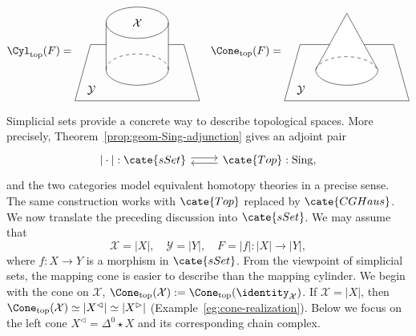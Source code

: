 \[ \Cyl_{\mathrm{top}}(F) = \begin{tikzpicture}[baseline=(O)]
	\draw (1, 1.5) ellipse[x radius=1, y radius=0.5] node {$\mathcal{X}$};
	\draw (0, 0) arc[start angle=180, end angle=360, x radius=1, y radius=0.5];
	\draw[dashed] (0, 0) arc[start angle=180, end angle=0, x radius=1, y radius=0.5];
	\draw (2, 1.5) -- (2, 0);
	\draw (0, 1.5) -- (0, 0);
	\draw (0, 0.8) -- (-0.5, 0.8) -- (-1, -1) node[xshift=1.5em,  yshift=1em] {$\mathcal{Y}$} -- (3, -1) -- (2.5, 0.8) -- (2, 0.8);
	\coordinate (O) at (0, 0.5);
\end{tikzpicture} \quad
	\Cone_{\mathrm{top}}(F) = \begin{tikzpicture}[baseline=(O)]
	\draw (0, 0.8) -- (-0.5, 0.8) -- (-1, -1) node[xshift=1.5em,  yshift=1em] {$\mathcal{Y}$} -- (3, -1) -- (2.5, 0.8) --cycle;
	\filldraw[fill=white] (1, 1.8) -- (0, 0) arc[start angle=180, end angle=360, x radius=1, y radius=0.5] --cycle;
	\draw[dashed] (0, 0) arc[start angle=170, end angle=10, x radius=1, y radius=0.5];
	\coordinate (O) at (0, 0.5);
\end{tikzpicture}\]

Simplicial sets provide a concrete way to describe topological spaces. More
precisely, Theorem~\ref{prop:geom-Sing-adjunction} gives an adjoint pair
\[\begin{tikzcd}
	{|\cdot|}: \cate{sSet} \arrow[shift left, r] & \cate{Top}: \mathrm{Sing}, \arrow[shift left, l]
\end{tikzcd}\]
and the two categories model equivalent homotopy theories in a precise
sense. The same construction works with $\cate{Top}$ replaced by
$\cate{CGHaus}$. We now translate the preceding discussion into
$\cate{sSet}$. We may assume that
\[ \mathcal{X} = |X|, \quad \mathcal{Y} = |Y|, \quad F = |f|: |X| \to |Y|, \]
where $f:X\to Y$ is a morphism in $\cate{sSet}$. From the viewpoint of
simplicial sets, the mapping cone is easier to describe than the mapping
cylinder. We begin with the cone on $\mathcal{X}$,
$\Cone_{\mathrm{top}}(\mathcal{X}):=
\Cone_{\mathrm{top}}(\identity_{\mathcal{X}})$. If
$\mathcal{X}=|X|$, then
$\Cone_{\mathrm{top}}(\mathcal{X})\simeq|X^{\lhd}|\simeq|X^{\rhd}|$
(Example~\ref{eg:cone-realization}). Below we focus on the left cone
$X^{\lhd}=\Delta^0\star X$ and its corresponding chain complex.

